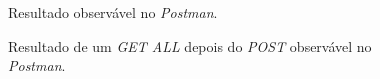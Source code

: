 \begin{figure}[h]
	\begin{center}
	\end{center}
	\caption{Resultado observável no \emph{Postman}.}\label{fig:eventfindbyid404}
\end{figure}
\newpage
\begin{figure}[h]
	\begin{center}
	\end{center}
	\caption{Resultado de um \emph{GET ALL} depois do \emph{POST} observável no \emph{Postman}.}\label{fig:eventallafterpost}
\end{figure}
\newpage


